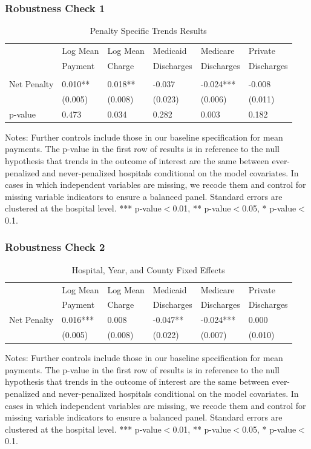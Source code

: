 \documentclass[ucs,9pt]{beamer}
\begin{document}
\begin{frame}
\frametitle{Robustness Check 1}
\begin{table}[htp]
\centering \normalsize
\caption{Penalty Specific Trends Results}
\footnotesize
\begin{tabular}{llllll}
\hline	
\hline
 			& Log Mean 		& Log Mean	& Medicaid 	   	& Medicare   		& Private  			\\
			& Payment		& 	Charge	& Discharges      	& Discharges       	& Discharges    \\
											\\
\hline											
Net Penalty 	&	0.010**	&	0.018**	&	-0.037	&	-0.024***	&	-0.008	\\
	&	(0.005)	&	(0.008)	&	(0.023)	&	(0.006)	&	(0.011)	\\
p-value & 0.473 & 0.034 & 0.282 & 0.003 & 0.182 \\
\hline
\end{tabular}
\end{table}
\tiny Notes: Further controls include those in our baseline specification for mean payments.  The p-value in the first row of results is in reference to the null hypothesis that trends in the outcome of interest are the same between ever-penalized and never-penalized hospitals conditional on the model covariates.  In cases in which independent variables are missing, we recode them and control for missing variable indicators to ensure a balanced panel.  Standard errors are clustered at the hospital level.  *** p-value$<$0.01, ** p-value$<$0.05, * p-value$<$0.1.
\end{frame}


\begin{frame}
\frametitle{Robustness Check 2}
\begin{table}[htp]
\centering \normalsize
\caption{Hospital, Year, and County Fixed Effects}
\footnotesize
\begin{tabular}{llllll}
\hline	
\hline
 			& Log Mean 		& Log Mean	& Medicaid 	   	& Medicare   		& Private  			\\
			& Payment		& 	Charge	& Discharges      	& Discharges       	& Discharges    \\
\hline											
Net Penalty 	&	0.016***	&	0.008	&	-0.047**	&	-0.024***	&	0.000	\\
	&	(0.005)	&	(0.008)	&	(0.022)	&	(0.007)	&	(0.010)	\\
	\hline
\end{tabular}
\end{table}
\tiny Notes: Further controls include those in our baseline specification for mean payments.  The p-value in the first row of results is in reference to the null hypothesis that trends in the outcome of interest are the same between ever-penalized and never-penalized hospitals conditional on the model covariates.  In cases in which independent variables are missing, we recode them and control for missing variable indicators to ensure a balanced panel.  Standard errors are clustered at the hospital level.  *** p-value$<$0.01, ** p-value$<$0.05, * p-value$<$0.1.
\end{frame}
\end{document}
